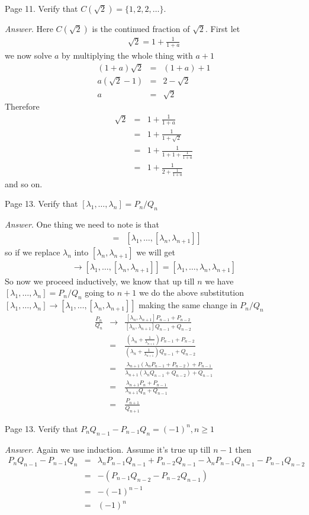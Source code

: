 \documentclass[aps,preprint,preprintnumbers,nofootinbib,showpacs,prd]{revtex4-1}
\newcommand{\nbea}{\begin{eqnarray*}}
\newcommand{\neea}{\end{eqnarray*}}
\begin{document}
Page 11. Verify that $C(\sqrt{2}) = \{1,2,2, \dots\}$.

{\it Answer}. Here $C(\sqrt{2})$ is the continued fraction of $\sqrt{2}$. First let 
%
\nbea
\sqrt{2} = 1 + \frac{1}{1 + a}
\neea
%
we now solve $a$ by multiplying the whole thing with $a + 1$
%
\nbea
(1 + a)\sqrt{2} & = & (1 + a) + 1 \\
a (\sqrt{2} - 1) & = & 2 - \sqrt{2} \\
a & = & \sqrt{2}
\neea
%
Therefore 
%
\nbea
\sqrt{2} & = & 1 + \frac{1}{1 + a} \\
& = & 1 + \frac{1}{1 + \sqrt{2}} \\
& = & 1 + \frac{1}{1 + 1 + \frac{1}{1 + a}} \\
& = & 1 + \frac{1}{2 + \frac{1}{1 + a}} 
\neea
%
and so on.


Page 13. Verify that $[\lambda_1, \dots, \lambda_n] = P_n/Q_n$

{\it Answer}. One thing we need to note is that 
%
\nbea
[\lambda_1, \dots, \lambda_n, \lambda_{n+1}] & = & [\lambda_1, \dots, [\lambda_n, \lambda_{n+1}]]
\neea
%
so if we replace $\lambda_n$ into $[\lambda_n, \lambda_{n+1}]$ we will get 
%
\nbea
[[\lambda_1, \dots, \lambda_n] \to [\lambda_1, \dots, [\lambda_n, \lambda_{n+1}]] = [\lambda_1, \dots, \lambda_n, \lambda_{n+1}]
\neea
%
So now we proceed inductively, we know that up till $n$ we have $[\lambda_1, \dots, \lambda_n] = P_n/Q_n$ going to $n + 1$ we do the above substitution $[\lambda_1, \dots, \lambda_n] \to [\lambda_1, \dots, [\lambda_n,\lambda_{n + 1}]]$ making the same change in $P_n/Q_n$
%
\nbea
\frac{P_n}{Q_n} & \to & \frac{[\lambda_n, \lambda_{n+1}] P_{n- 1} + P_{n-2}}{[\lambda_n, \lambda_{n+1}] Q_{n- 1} + Q_{n-2}} \\
& = & \frac{\left ( \lambda_n + \frac{1}{\lambda_{n+1}}\right )P_{n- 1} + P_{n-2}}{\left ( \lambda_n + \frac{1}{\lambda_{n+1}}\right ) Q_{n- 1} + Q_{n-2}} \\
& = & \frac{\lambda_{n+1}(\lambda_n P_{n- 1} + P_{n-2}) + P_{n - 1}}{\lambda_{n+1}(\lambda_n Q_{n- 1} + Q_{n-2}) + Q_{n - 1}} \\
& = & \frac{\lambda_{n+1}P_n + P_{n - 1}}{\lambda_{n+1}Q_n + Q_{n - 1}} \\
& = & \frac{P_{n+1}}{Q_{n+1}}
\neea
%

Page 13. Verify that $P_nQ_{n-1} - P_{n-1}Q_n = (-1)^n, n \ge 1$

{\it Answer}. Again we use induction. Assume it's true up till $n - 1$ then 
%
\nbea
P_nQ_{n-1} - P_{n-1}Q_n & = & \lambda_n P_{n - 1}Q_{n - 1} + P_{n - 2}Q_{n-1} - \lambda_nP_{n-1}Q_{n-1} - P_{n-1}Q_{n - 2} \\
& = & -(P_{n-1}Q_{n - 2} - P_{n-2}Q_{n - 1}) \\
& = & -(-1)^{n-1} \\
& = & (-1)^n
\neea
%
\end{document}
